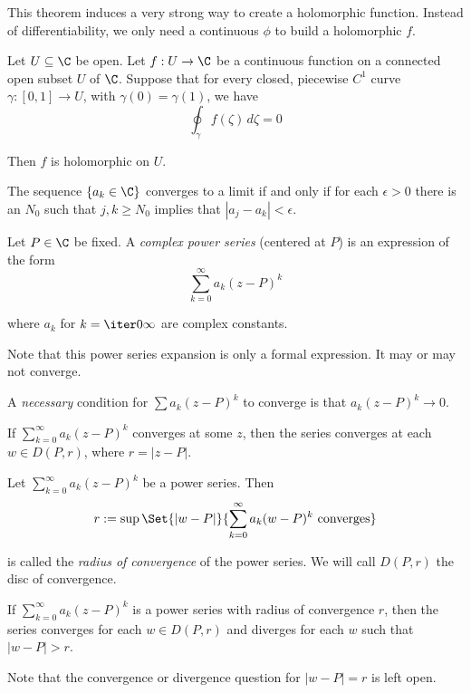 This theorem induces a very strong way to create a holomorphic
function. Instead of differentiability, we only need a continuous
$\phi$ to build a holomorphic $f$.

\label{f378992}

Let $U\subseteq\C$ be open. Let $f:U\to\C$ be a continuous function on
a connected open subset $U$ of $\C$. Suppose that for every closed,
piecewise $C^1$ curve $\gamma:[0,1]\to U$, with $\gamma(0)=\gamma(1)$,
we have
$$\oint_\gamma f(\zeta)\,d\zeta=0$$

Then $f$ is holomorphic on $U$.

\label{db44655}

The sequence $\{a_k\in\C\}$ converges to a limit if and only if for
each $\epsilon>0$ there is an $N_0$ such that $j,k\geq N_0$ implies
that $|a_j-a_k|<\epsilon$.

\label{b9a7c59}

Let $P\in\C$ be fixed. A \textit{complex power series} (centered at
$P$) is an expression of the form
$$
	\sum_{k=0}^\infty a_k(z-P)^k
$$

where $a_k$ for $k=\iter0\infty$ are complex constants.

Note that this power series expansion is only a formal expression. It
may or may not converge.

A \textit{necessary} condition for $\sum a_k(z-P)^k$ to converge is
that $a_k(z-P)^k\to0$.

\label{d5d5bdc}

If $\sum_{k=0}^\infty a_k(z-P)^k$ converges at some $z$, then the
series converges at each $w\in D(P,r)$, where $r=|z-P|$.

\label{da6e337}

Let $\sum_{k=0}^\infty a_k(z-P)^k$ be a power series. Then
$$
	r:=\sup\Set{|w-P|}{\sum_{k=0}^\infty a_k(w-P)^k\text{ converges}}
$$

is called the \textit{radius of convergence} of the power series. We
will call $D(P,r)$ the disc of convergence.

\label{c7d0e1d}

If $\sum_{k=0}^\infty a_k(z-P)^k$ is a power series with radius of
convergence $r$, then the series converges for each $w\in D(P,r)$ and
diverges for each $w$ such that $|w-P|>r$.

Note that the convergence or divergence question for $|w-P|=r$ is left
open.


